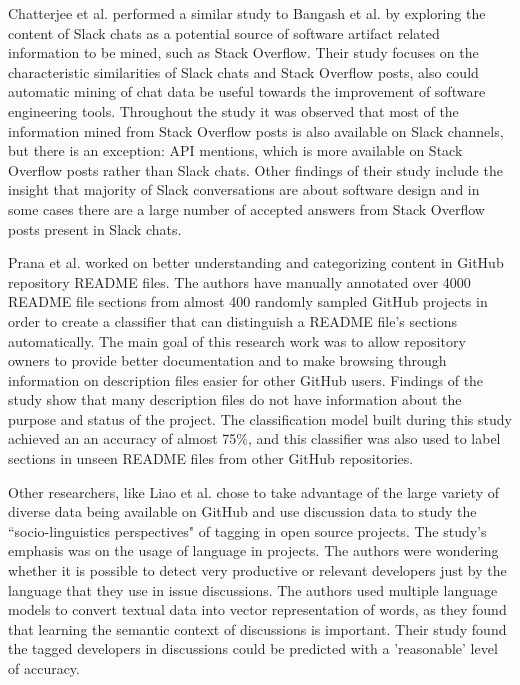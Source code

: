         Chatterjee et al. \cite{chatterjee2019exploratory} performed a similar study to Bangash et al. \cite{bangash2019developers} by exploring the content of Slack chats as a potential source of software artifact related information to be mined, such as Stack Overflow. Their study focuses on the characteristic similarities of Slack chats and Stack Overflow posts, also could automatic mining of chat data be useful towards the improvement of software engineering tools. Throughout the study it was observed that most of the information mined from Stack Overflow posts is also available on Slack channels, but there is an exception: API mentions, which is more available on Stack Overflow posts rather than Slack chats. Other findings of their study include the insight that majority of Slack conversations are about software design and in some cases there are a large number of accepted answers from Stack Overflow posts present in Slack chats.
         
        Prana et al. \cite{prana2019categorizing} worked on better understanding and categorizing content in GitHub repository README files. The authors have manually annotated over 4000 README file sections from almost 400 randomly sampled GitHub projects in order to create a classifier that can distinguish a README file's sections automatically. The main goal of this research work was to allow repository owners to provide better documentation and to make browsing through information on description files easier for other GitHub users. Findings of the study show that many description files do not have information about the purpose and status of the project. The classification model built during this study achieved an an accuracy of almost 75\%, and this classifier was also used to label sections in unseen README files from other GitHub repositories.

        Other researchers, like Liao et al. \cite{liao2019status} chose to take advantage of the large variety of diverse data being available on GitHub and use discussion data to study the ``socio-linguistics perspectives" of tagging in open source projects. The study's emphasis was on the usage of language in projects. The authors were wondering whether it is possible to detect very productive or relevant developers just by the language that they use in issue discussions. The authors used multiple language models to convert textual data into vector representation of words, as they found that learning the semantic context of discussions is important. Their study found the tagged developers in discussions could be predicted with a 'reasonable' level of accuracy.

